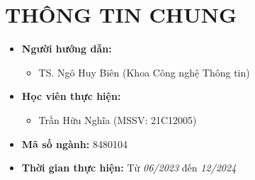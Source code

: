 \documentclass{article}[14pt]
\begin{document}
    \vspace{.5cm}
    
    \Large
    \section{THÔNG TIN CHUNG}
    \begin{itemize}[label = {}]
        
        \item \textbf{Người hướng dẫn:} 
        \begin{itemize}
            \item TS. Ngô Huy Biên (Khoa Công nghệ Thông tin)
        \end{itemize}{}
    
        
        \item \textbf{Học viên thực hiện:}
        
        \begin{itemize}
        
            \item Trần Hữu Nghĩa (MSSV: 21C12005) 
           
        \end{itemize}

        \item \textbf{Mã số ngành:} 8480104
        
        \item \textbf{Thời gian thực hiện:} Từ \textit{06/2023} đến \textit{12/2024}
        
        
    \end{itemize}
    
    \pagebreak 
\end{document}
